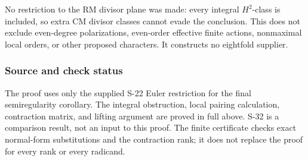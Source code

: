 No restriction to the RM divisor plane was made: every integral
\(H^2\)-class is included, so extra CM divisor classes cannot evade the
conclusion. This does not exclude even-degree polarizations, even-order
effective finite actions, nonmaximal local orders, or other proposed
characters. It constructs no eightfold supplier.

\subsubsection{Source and check status}\label{source-and-check-status}

The proof uses only the supplied S-22 Euler restriction for the final
semiregularity corollary. The integral obstruction, local pairing
calculation, contraction matrix, and lifting argument are proved in full
above. S-32 is a comparison result, not an input to this proof. The
finite certificate checks exact normal-form substitutions and the
contraction rank; it does not replace the proof for every rank or every
radicand.
